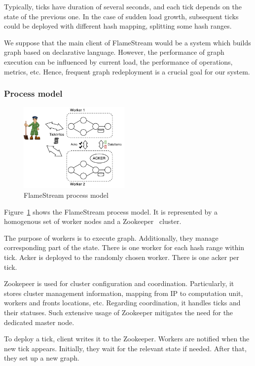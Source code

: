 Typically, ticks have duration of several seconds, and each tick depends on the state of the previous one. In the case of sudden load growth, subsequent ticks could be deployed with different hash mapping, splitting some hash ranges.

We suppose that the main client of FlameStream would be a system which builds graph based on declarative language. However, the performance of graph execution can be influenced by current load, the performance of operations, metrics, etc. Hence, frequent graph redeployment is a crucial goal for our system.

\subsubsection{Process model}
\begin{figure}[htbp]
  \centering
  \includegraphics[width=0.48\textwidth]{pics/process-model}
  \caption{FlameStream process model}
  \label {process-model}
\end{figure}

Figure~\ref{process-model} shows the FlameStream process model. It is represented by a homogenous set of worker nodes and a Zookeeper~\cite{hunt2010zookeeper} cluster.  

The purpose of workers is to execute graph. Additionally, they manage corresponding part of the state. There is one worker for each hash range within tick. Acker is deployed to the randomly chosen worker. There is one acker per tick. 

Zookepeer is used for cluster configuration and coordination. Particularly, it stores cluster management information, mapping from IP to computation unit, workers and fronts locations, etc. Regarding coordination, it handles ticks and their statuses. Such extensive usage of Zookeeper mitigates the need for the dedicated master node.

To deploy a tick, client writes it to the Zookeeper. Workers are notified when the new tick appears. Initially, they wait for the relevant state if needed. After that, they set up a new graph.

